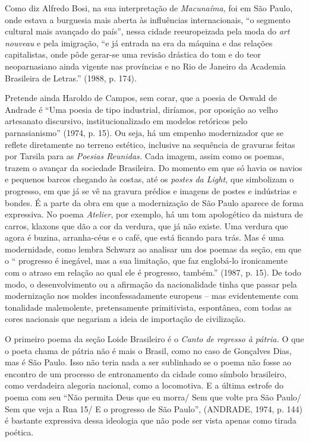 Como diz Alfredo Bosi, na sua interpretação de \emph{Macunaíma,} foi em
São Paulo, onde estava a burguesia mais aberta às influências
internacionais, ``o segmento cultural mais avançado do país'', nessa
cidade reeuropeizada pela moda do \emph{art nouveau} e pela imigração,
``e já entrada na era da máquina e das relações capitalistas, onde pôde
gerar-se uma revisão drástica do tom e do teor neoparnasiano ainda
vigente nas províncias e no Rio de Janeiro da Academia Brasileira de
Letras.'' (1988, p. 174).

Pretende ainda Haroldo de Campos, sem corar, que a poesia de Oswald de
Andrade é ``Uma poesia de tipo industrial, diríamos, por oposição ao
velho artesanato discursivo, institucionalizado em modelos retóricos
pelo parnasianismo'' (1974, p. 15). Ou seja, há um empenho modernizador
que se reflete diretamente no terreno estético, inclusive na sequência
de gravuras feitas por Tarsila para as \emph{Poesias Reunidas.} Cada
imagem, assim como os poemas, trazem o avançar da sociedade Brasileira.
Do momento em que só havia os navios e pequenos barcos chegando às
costas, até os \emph{postes da Light,} que simbolizam o progresso, em
que já se vê na gravura prédios e imagens de postes e indústrias e
bondes. É a parte da obra em que a modernização de São Paulo aparece de
forma expressiva. No poema \emph{Atelier}, por exemplo, há um tom
apologético da mistura de carros, klaxons que dão a cor da verdura, que
já não existe. Uma verdura que agora é buzina, arranha-céus e o café,
que está ficando para trás. Mas é uma modernidade, como lembra Schwarz
ao analisar um dos poemas da seção, em que o `` progresso é inegável,
mas a sua limitação, que faz englobá-lo ironicamente com o atraso em
relação ao qual ele é progresso, também.'' (1987, p. 15). De todo modo,
o desenvolvimento ou a afirmação da nacionalidade tinha que passar pela
modernização nos moldes inconfessadamente europeus -- mas evidentemente
com tonalidade malemolente, pretensamente primitivista, espontânea, com
todas as cores nacionais que negariam a ideia de importação de
civilização.

O primeiro poema da seção Loide Brasileiro é o \emph{Canto de regresso à
pátria.} O que o poeta chama de pátria não é mais o Brasil, como no caso
de Gonçalves Dias, mas é São Paulo. Isso não teria nada a ser sublinhado
se o poema não fosse ao encontro de um processo de entronamento da
cidade como símbolo brasileiro, como verdadeira alegoria nacional, como
a locomotiva. E a última estrofe do poema com seu ``Não permita Deus que
eu morra/ Sem que volte pra São Paulo/ Sem que veja a Rua 15/ E o
progresso de São Paulo'', (ANDRADE, 1974, p. 144) é bastante expressiva
dessa ideologia que não pode ser vista apenas como tirada poética.

